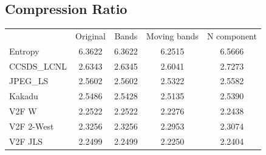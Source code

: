 \documentclass{article}
\begin{document}
\subsection*{Compression Ratio}
\begin{table}[h]
\begin{tabular}{lcccc}
\rowcolor[HTML]{C0C0C0} 
 & Original & Bands & Moving bands & N component \\
\cellcolor[HTML]{C0C0C0}Entropy & \cellcolor[HTML]{E0E0E0}6.3622 &  \cellcolor[HTML]{E0E0E0}6.3622 &  \cellcolor[HTML]{E0E0E0}6.2515 &  \cellcolor[HTML]{E0E0E0} 6.5666\\ 
\cellcolor[HTML]{C0C0C0}CCSDS\_LCNL & 2.6343 & 2.6345 & 2.6041 & \cellcolor[HTML]{DAE8FC} 2.7273\\
\cellcolor[HTML]{C0C0C0}JPEG\_LS    & \cellcolor[HTML]{DAE8FC}2.5602 & \cellcolor[HTML]{DAE8FC}2.5602 & 2.5322 & 2.5582\\
\cellcolor[HTML]{C0C0C0}Kakadu      & \cellcolor[HTML]{DAE8FC}2.5486 & 2.5428 & 2.5135 & 2.5390\\
\cellcolor[HTML]{C0C0C0}V2F W       & \cellcolor[HTML]{DAE8FC}2.2522 & \cellcolor[HTML]{DAE8FC}2.2522 & 2.2276 & 2.2438\\
\cellcolor[HTML]{C0C0C0}V2F 2-West  & \cellcolor[HTML]{DAE8FC}2.3256 & \cellcolor[HTML]{DAE8FC}2.3256 & 2.2953 & 2.3074\\
\cellcolor[HTML]{C0C0C0}V2F JLS     & \cellcolor[HTML]{DAE8FC}2.2499 & \cellcolor[HTML]{DAE8FC}2.2499 & 2.2250 & 2.2404\\
\end{tabular}
\end{table}
\end{document}
